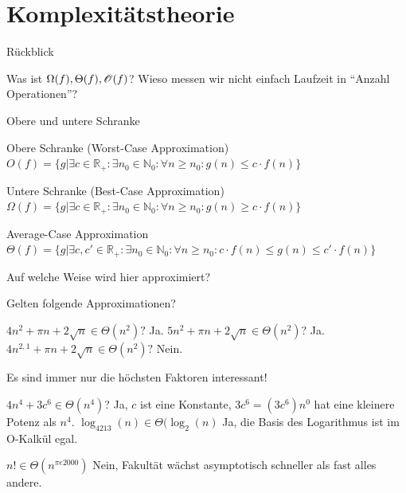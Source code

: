 \def\tutdate{26.01.2017}


\section{Komplexitätstheorie}
\begin{frame}{Rückblick}
	\begin{itemize}
		\pitem Was ist $\Omega(f), \Theta(f), \mathscr{O}(f)$?
		\pitem Wieso messen wir nicht einfach Laufzeit in ``Anzahl Operationen''?
		
	\end{itemize}
\end{frame}

\begin{frame}{Obere und untere Schranke}
	\begin{block}{Obere Schranke (Worst-Case Approximation)}
		$O(f) = \{g| \exists c \in \mathbb{R}_+ : \exists n_0 \in \mathbb{N}_0: \forall n \geq n_0 : g(n)\leq c \cdot f(n)\}$
	\end{block}
	
	\pause
	
	\begin{block}{Untere Schranke (Best-Case Approximation)}
		$\Omega(f) = \{g| \exists c \in \mathbb{R}_+ : \exists n_0 \in \mathbb{N}_0: \forall n \geq n_0 : g(n)\geq c \cdot f(n)\}$
	\end{block}

	\pause

	\begin{block}{Average-Case Approximation}
		$\Theta(f) = \{g|\exists c, c' \in \mathbb{R}_+ : \exists n_0 \in \mathbb{N}_0: \forall n \geq n_0 : c \cdot f(n) \leq g(n)\leq c' \cdot f(n)\}$
	\end{block}

	\pause
	
	Auf welche Weise wird hier approximiert? %
\end{frame}

\begin{frame}
	Gelten folgende Approximationen?
	
	\begin{itemize}
		\pitem $4n^2 + \pi n + 2 \sqrt{n} \in \Theta(n^2)?$ \pause Ja.
		\pitem $5n^2 + \pi n + 2 \sqrt{n} \in \Theta(n^2)?$ \pause Ja.
		\pitem $4n^{2,1} + \pi n + 2 \sqrt{n} \in \Theta(n^2)?$ \pause Nein.
	\end{itemize}

	\bp Es sind immer nur die höchsten Faktoren interessant!
	
	\begin{itemize}
		\pitem $4n^4 + 3c^6 \in \Theta(n^4)$? \pause Ja\ip, $c$ ist eine Konstante, $3c^6=(3c^6)n^0$ hat eine kleinere Potenz als $n^4$.
		\pitem $\log_{4213}(n) \in \Theta(\log_2(n)$ \pause Ja\ip, die Basis des Logarithmus ist im O-Kalkül egal.
		
		\pitem $n! \in \Theta(n^{\pi e 2000})$ \pause Nein\ip, Fakultät wächst asymptotisch schneller als fast alles andere.
	\end{itemize}
\end{frame}

